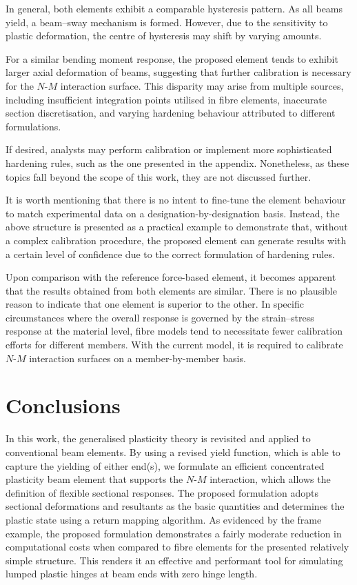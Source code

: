 In general, both elements exhibit a comparable hysteresis pattern. As all beams yield, a beam--sway mechanism is formed. However, due to the sensitivity to plastic deformation, the centre of hysteresis may shift by varying amounts.

For a similar bending moment response, the proposed element tends to exhibit larger axial deformation of beams, suggesting that further calibration is necessary for the $N$-$M$ interaction surface. This disparity may arise from multiple sources, including insufficient integration points utilised in fibre elements, inaccurate section discretisation, and varying hardening behaviour attributed to different formulations.

If desired, analysts may perform calibration or implement more sophisticated hardening rules, such as the one presented in the appendix. Nonetheless, as these topics fall beyond the scope of this work, they are not discussed further.

It is worth mentioning that there is no intent to fine-tune the element behaviour to match experimental data on a designation-by-designation basis. Instead, the above structure is presented as a practical example to demonstrate that, without a complex calibration procedure, the proposed element can generate results with a certain level of confidence due to the correct formulation of hardening rules.

Upon comparison with the reference force-based element, it becomes apparent that the results obtained from both elements are similar. There is no plausible reason to indicate that one element is superior to the other. In specific circumstances where the overall response is governed by the strain--stress response at the material level, fibre models tend to necessitate fewer calibration efforts for different members. With the current model, it is required to calibrate $N$-$M$ interaction surfaces on a member-by-member basis.
\section{Conclusions}
In this work, the generalised plasticity theory is revisited and applied to conventional beam elements.
By using a revised yield function, which is able to capture the yielding of either end(s), we formulate an efficient concentrated plasticity beam element that supports the $N$-$M$ interaction, which allows the definition of flexible sectional responses.
The proposed formulation adopts sectional deformations and resultants as the basic quantities and determines the plastic state using a return mapping algorithm.
As evidenced by the frame example, the proposed formulation demonstrates a fairly moderate reduction in computational costs when compared to fibre elements for the presented relatively simple structure.
This renders it an effective and performant tool for simulating lumped plastic hinges at beam ends with zero hinge length.


